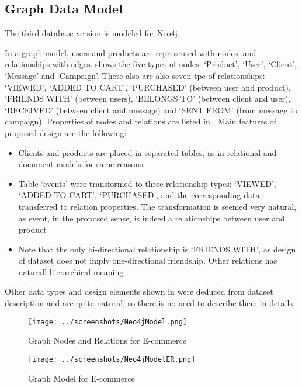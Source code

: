\documentclass[conference]{IEEEtran}
\begin{document}
\subsection{Graph Data Model}
The third database version is modeled for Neo4j.

In a graph model, users and products are represented with nodes, and relationships with edges.
 shows the five types of nodes: `Product', `User', `Client', `Message' and `Campaign'. There also are also seven tpe of relationships: `VIEWED', `ADDED TO CART', `PURCHASED' (between user and product), `FRIENDS WITH' (between users), `BELONGS TO' (between client and user), `RECEIVED' (between client and message) and `SENT FROM' (from message to campaign). Properties of nodes and relations are listed in . Main features of proposed design are the following:
\begin{itemize}
    \item Clients and products are placed in separated tables, as in relational and document models for same reasons
    \item Table `events' were transformed to three relationship types: `VIEWED', `ADDED TO CART', `PURCHASED', and the corresponding data transferred to relation properties. The transformation is seemed very natural, as event, in the proposed sense, is indeed a relationships between user and product
    \item Note that the only bi-directional relationship is `FRIENDS WITH', as design of dataset does not imply one-directional friendship. Other relations has naturall hierarchical meaning
\end{itemize}
Other data types and design elements shown in  were deduced from dataset description and are quite natural, so there is no need to describe them in details.

\begin{figure}[htbp]
    \centerline{\texttt{[image: ../screenshots/Neo4jModel.png]}}
    \caption{Graph Nodes and Relations for E-commerce}\label{fig:neo4j_model}
\end{figure}

\begin{figure}[htbp]
    \centerline{\texttt{[image: ../screenshots/Neo4jModelER.png]}}
    \caption{Graph Model for E-commerce}\label{fig:neo4j_ermodel}
\end{figure}
\end{document}
